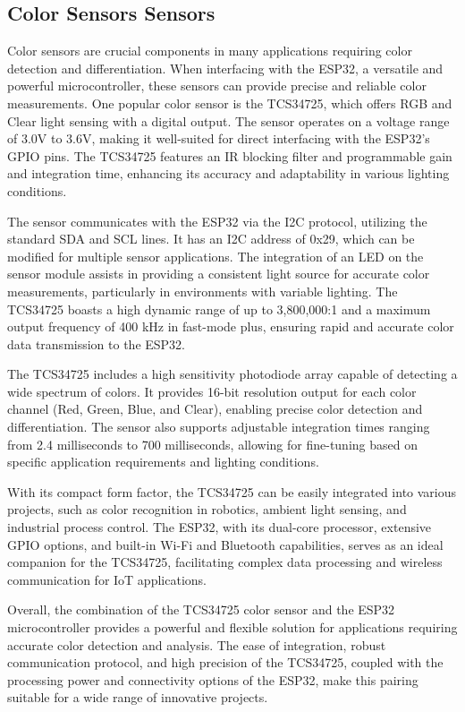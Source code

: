 \subsection{Color Sensors Sensors}

Color sensors are crucial components in many applications requiring color detection and differentiation. When interfacing with the ESP32, a versatile and powerful microcontroller, these sensors can provide precise and reliable color measurements. One popular color sensor is the TCS34725, which offers RGB and Clear light sensing with a digital output. The sensor operates on a voltage range of 3.0V to 3.6V, making it well-suited for direct interfacing with the ESP32's GPIO pins. The TCS34725 features an IR blocking filter and programmable gain and integration time, enhancing its accuracy and adaptability in various lighting conditions.

The sensor communicates with the ESP32 via the I2C protocol, utilizing the standard SDA and SCL lines. It has an I2C address of 0x29, which can be modified for multiple sensor applications. The integration of an LED on the sensor module assists in providing a consistent light source for accurate color measurements, particularly in environments with variable lighting. The TCS34725 boasts a high dynamic range of up to 3,800,000:1 and a maximum output frequency of 400 kHz in fast-mode plus, ensuring rapid and accurate color data transmission to the ESP32.

The TCS34725 includes a high sensitivity photodiode array capable of detecting a wide spectrum of colors. It provides 16-bit resolution output for each color channel (Red, Green, Blue, and Clear), enabling precise color detection and differentiation. The sensor also supports adjustable integration times ranging from 2.4 milliseconds to 700 milliseconds, allowing for fine-tuning based on specific application requirements and lighting conditions.

With its compact form factor, the TCS34725 can be easily integrated into various projects, such as color recognition in robotics, ambient light sensing, and industrial process control. The ESP32, with its dual-core processor, extensive GPIO options, and built-in Wi-Fi and Bluetooth capabilities, serves as an ideal companion for the TCS34725, facilitating complex data processing and wireless communication for IoT applications.

Overall, the combination of the TCS34725 color sensor and the ESP32 microcontroller provides a powerful and flexible solution for applications requiring accurate color detection and analysis. The ease of integration, robust communication protocol, and high precision of the TCS34725, coupled with the processing power and connectivity options of the ESP32, make this pairing suitable for a wide range of innovative projects.

